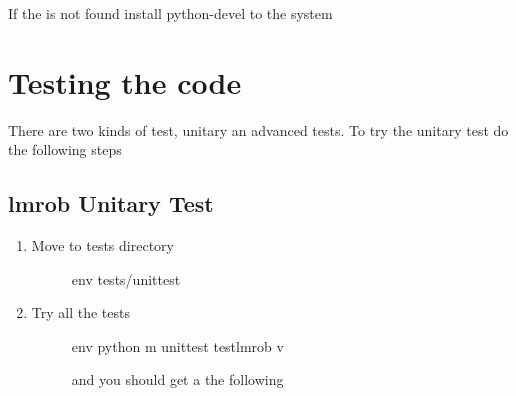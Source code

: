\documentclass[letterpaper,10pt,english]{sphinxmanual}
\begin{document}
If the  is not found install python-devel to the system


\chapter{Testing the code}
\label{\detokenize{tests:testing-the-code}}\label{\detokenize{tests:tests}}\label{\detokenize{tests::doc}}
There are two kinds of test, unitary an advanced tests. To try the unitary test do the following steps


\section{lmrob Unitary Test}
\label{\detokenize{tests:lmrob-unitary-test}}\begin{enumerate}
\item {} \begin{description}
\item[{Move to tests directory}] \leavevmode
{}%
\begin{sphinxVerbatim}[commandchars=\\\{\}]
env \PYGZdl{}  tests/unittest
\end{sphinxVerbatim}

\end{description}

\item {} \begin{description}
\item[{Try all the tests}] \leavevmode
{}%
\begin{sphinxVerbatim}[commandchars=\\\{\}]
env \PYGZdl{} python \PYGZhy{}m unittest test\PYGZus{}lmrob \PYGZhy{}v
\end{sphinxVerbatim}

and you should get a the following


\end{description}
\end{enumerate}
\end{document}
